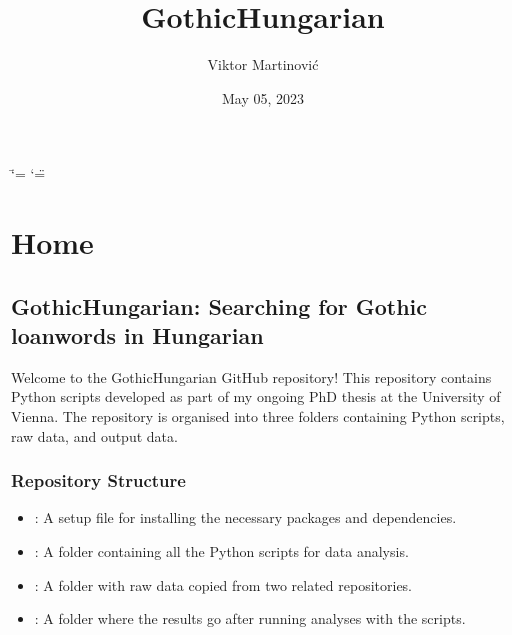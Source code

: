 \documentclass[letterpaper,10pt,english]{sphinxmanual}
\title{GothicHungarian}
\date{May 05, 2023}
\author{Viktor Martinović}
\begin{document}
\ifdefined\shorthandoff
  \ifnum\catcode`\=\string=\active\shorthandoff{=}\fi
  \ifnum\catcode`\"=\active{}\fi
\fi

\pagestyle{empty}
\sphinxmaketitle
\pagestyle{plain}
\sphinxtableofcontents
\pagestyle{normal}
\label{\detokenize{index::doc}}


\sphinxstepscope


\chapter{Home}
\label{\detokenize{home:home}}\label{\detokenize{home::doc}}

\section{GothicHungarian: Searching for Gothic loanwords in Hungarian}
\label{\detokenize{home:gothichungarian-searching-for-gothic-loanwords-in-hungarian}}
\sphinxAtStartPar
{}  

\sphinxAtStartPar
Welcome to the GothicHungarian GitHub repository! This repository
contains Python scripts developed as part of my ongoing PhD thesis at
the University of Vienna. The repository is organised into three folders
containing Python scripts, raw data, and output data.


\subsection{Repository Structure}
\label{\detokenize{home:repository-structure}}\begin{itemize}
\item {} 
\sphinxAtStartPar
{}: A setup file for installing the necessary packages and
dependencies.

\item {} 
\sphinxAtStartPar
{}: A folder containing all the Python scripts for
data analysis.

\item {} 
\sphinxAtStartPar
{}: A folder with raw data copied from two related repositories.

\item {} 
\sphinxAtStartPar
{}: A folder where the results go after running analyses with
the scripts.

\end{itemize}
\end{document}
